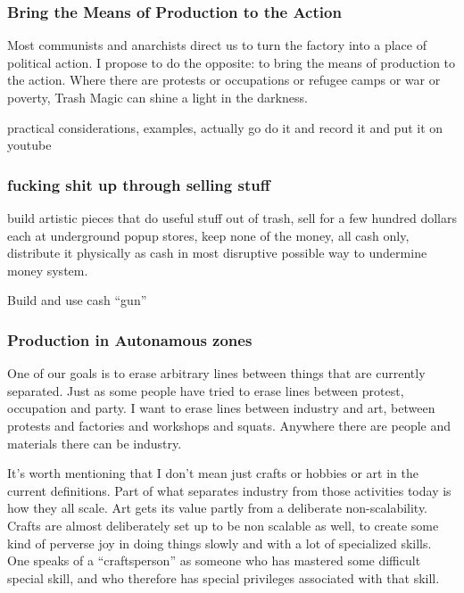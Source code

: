 \subsubsection{Bring the Means of Production to the
Action}\label{bring-the-means-of-production-to-the-action}

Most communists and anarchists direct us to turn the factory into a
place of political action. I propose to do the opposite: to bring the
means of production to the action. Where there are protests or
occupations or refugee camps or war or poverty, Trash Magic can shine a
light in the darkness.

practical considerations, examples, actually go do it and record it and
put it on youtube

\subsubsection{fucking shit up through selling
stuff}\label{fucking-shit-up-through-selling-stuff}

build artistic pieces that do useful stuff out of trash, sell for a few
hundred dollars each at underground popup stores, keep none of the
money, all cash only, distribute it physically as cash in most
disruptive possible way to undermine money system.

Build and use cash ``gun''

\subsubsection{Production in Autonamous
zones}\label{production-in-autonamous-zones}

One of our goals is to erase arbitrary lines between things that are
currently separated. Just as some people have tried to erase lines
between protest, occupation and party. I want to erase lines between
industry and art, between protests and factories and workshops and
squats. Anywhere there are people and materials there can be industry.

It's worth mentioning that I don't mean just crafts or hobbies or art in
the current definitions. Part of what separates industry from those
activities today is how they all scale. Art gets its value partly from a
deliberate non-scalability. Crafts are almost deliberately set up to be
non scalable as well, to create some kind of perverse joy in doing
things slowly and with a lot of specialized skills. One speaks of a
``craftsperson'' as someone who has mastered some difficult special
skill, and who therefore has special privileges associated with that
skill.

